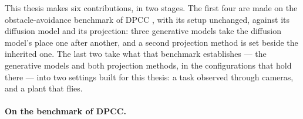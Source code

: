 \documentclass[headsepline,footsepline,footinclude=false,oneside,fontsize=11pt,paper=a4,listof=totoc,bibliography=totoc]{scrbook}
\theoremstyle{definition}
\theoremstyle{plain}
\theoremstyle{remark}
\begin{document}
This thesis makes six contributions, in two stages. The first four are made on the obstacle-avoidance
benchmark of \ac{DPCC} \parencite{romer2025diffusion,jia2024towards}, with its setup unchanged, against
its diffusion model and its projection: three generative models take the diffusion model's place one
after another, and a second projection method is set beside the inherited one. The last two take what
that benchmark establishes --- the generative models and both projection methods, in the
configurations that hold there --- into two settings built for this thesis: a task observed through
cameras, and a plant that flies.

\paragraph{On the benchmark of \ac{DPCC}.}
\end{document}
